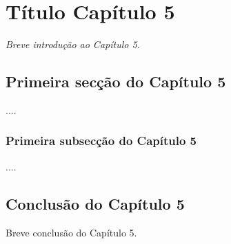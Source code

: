 \chapter{Título Capítulo 5} 
\label{cap:5}
\emph{Breve introdução ao Capítulo 5.}


\section{Primeira secção do Capítulo 5}

....

\subsection{Primeira subsecção do Capítulo 5}

....





\section{Conclusão do Capítulo 5}

Breve conclusão do Capítulo 5.